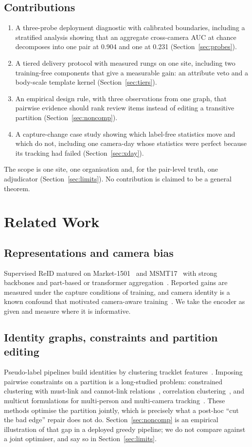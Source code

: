 \documentclass[journal]{IEEEtran}
\begin{document}
\subsection{Contributions}
\begin{enumerate}
\item A three-probe deployment diagnostic with calibrated boundaries, including a stratified analysis showing that an aggregate cross-camera AUC at chance decomposes into one pair at 0.904 and one at 0.231 (Section~\ref{sec:probes}).
\item A tiered delivery protocol with measured rungs on one site, including two training-free components that give a measurable gain: an attribute veto and a body-scale template kernel (Section~\ref{sec:tiers}).
\item An empirical design rule, with three observations from one graph, that pairwise evidence should rank review items instead of editing a transitive partition (Section~\ref{sec:noncomp}).
\item A capture-change case study showing which label-free statistics move and which do not, including one camera-day whose statistics were perfect because its tracking had failed (Section~\ref{sec:xday}).
\end{enumerate}

The scope is one site, one organisation and, for the pair-level truth, one adjudicator (Section~\ref{sec:limits}). No contribution is claimed to be a general theorem.

\section{Related Work}
\subsection{Representations and camera bias}
Supervised ReID matured on Market-1501~\cite{zheng2015} and MSMT17~\cite{wei2018} with strong backbones and part-based or transformer aggregation~\cite{zhou2019,he2021,ye2022}. Reported gains are measured under the capture conditions of training, and camera identity is a known confound that motivated camera-aware training~\cite{tang2026,wang2026carr,xiao2026}. We take the encoder as given and measure where it is informative.

\subsection{Identity graphs, constraints and partition editing}
Pseudo-label pipelines build identities by clustering tracklet features~\cite{tang2026,ge2020}. Imposing pairwise constraints on a partition is a long-studied problem: constrained clustering with must-link and cannot-link relations~\cite{wagstaff2001}, correlation clustering~\cite{bansal2004}, and multicut formulations for multi-person and multi-camera tracking~\cite{tang2017,ristani2018}. These methods optimise the partition jointly, which is precisely what a post-hoc ``cut the bad edge'' repair does not do. Section~\ref{sec:noncomp} is an empirical illustration of that gap in a deployed greedy pipeline; we do not compare against a joint optimiser, and say so in Section~\ref{sec:limits}.
\end{document}
